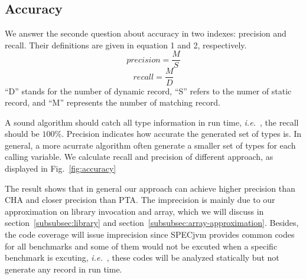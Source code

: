 \documentclass{fac}
\newcommand\ie{\textit{i.e.\ }}
\begin{document}
\subsection{Accuracy}\label{subsec:accuracy}
We answer the seconde question about accuracy in two indexes: precision and recall. Their definitions are given in equation 1 and 2, respectively.
\begin{equation}
precision =  \dfrac{M}{S} 
\end{equation}
\begin{equation}
recall = \dfrac{M}{D} 
\end{equation}
``D'' stands for the number of dynamic record, ``S'' refers to the numer of static record, and ``M'' represents the number of matching record. 

A sound algorithm should catch all type information in run time, \ie, the recall should be $100\%$. Precision indicates how accurate the generated set of types is. In general, a more acurrate algorithm often generate a smaller set of types for each calling variable. We calculate recall and precision of different approach, as displayed in Fig.~\ref{fig:accuracy}

The result shows that in general our approach can achieve higher precision than CHA and closer precision than PTA. The imprecision is mainly due to our approximation on library invocation and array, which we will discuss in section~\ref{subsubsec:library} and section~\ref{subsubsec:array-approximation}. Besides, the code coverage will issue imprecision since SPECjvm provides common codes for all benchmarks and some of them would not be excuted when a specific benchmark is excuting, \ie, these codes will be analyzed statically but not generate any record in run time.
\end{document}
